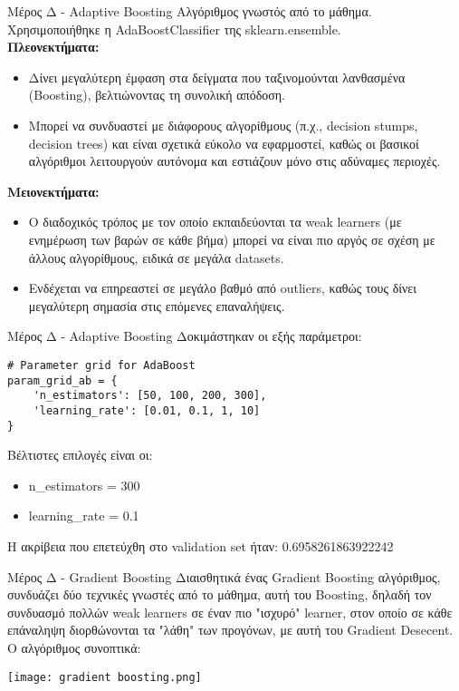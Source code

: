 \documentclass{beamer}
\begin{document}
\begin{frame}[fragile]{Μέρος Δ - Adaptive Boosting}
Αλγόριθμος γνωστός από το μάθημα. Χρησιμοποιήθηκε η AdaBoostClassifier της sklearn.ensemble.\\
\textbf{Πλεονεκτήματα:}
\begin{itemize}
    \item Δίνει μεγαλύτερη έμφαση στα δείγματα που ταξινομούνται λανθασμένα (Boosting), βελτιώνοντας τη συνολική απόδοση.
    \item Μπορεί να συνδυαστεί με διάφορους αλγορίθμους (π.χ., decision stumps, decision trees) και είναι σχετικά εύκολο να εφαρμοστεί, καθώς οι βασικοί αλγόριθμοι λειτουργούν αυτόνομα και εστιάζουν μόνο στις αδύναμες περιοχές.
\end{itemize}
\textbf{Μειονεκτήματα:}
\begin{itemize}
    \item Ο διαδοχικός τρόπος με τον οποίο εκπαιδεύονται τα weak learners (με ενημέρωση των βαρών σε κάθε βήμα) μπορεί να είναι πιο αργός σε σχέση με άλλους αλγορίθμους, ειδικά σε μεγάλα datasets.
    \item Ενδέχεται να επηρεαστεί σε μεγάλο βαθμό από outliers, καθώς τους δίνει μεγαλύτερη σημασία στις επόμενες επαναλήψεις.
\end{itemize}
\end{frame}
\begin{frame}[fragile]{Μέρος Δ -  Adaptive Boosting}
Δοκιμάστηκαν οι εξής παράμετροι:
\lstset{style=python}
\begin{lstlisting}
# Parameter grid for AdaBoost
param_grid_ab = {
    'n_estimators': [50, 100, 200, 300],
    'learning_rate': [0.01, 0.1, 1, 10]
}

\end{lstlisting}

Βέλτιστες επιλογές είναι οι:
\begin{itemize}
    \item n\_estimators = 300
    \item learning\_rate = 0.1

\end{itemize}
Η ακρίβεια που επετεύχθη στο validation set ήταν: 0.6958261863922242
\end{frame}



\begin{frame}[fragile]{Μέρος Δ - Gradient Boosting}
Διαισθητικά ένας Gradient Boosting αλγόριθμος, συνδυάζει δύο τεχνικές γνωστές από το μάθημα, αυτή του Boosting, δηλαδή τον συνδυασμό πολλών weak learners σε έναν πιο "ισχυρό" learner, στον οποίο σε κάθε επάναληψη διορθώνονται τα "λάθη" των προγόνων, με αυτή του Gradient Desecent. Ο αλγόριθμος συνοπτικά:

\begin{minipage}[t]{\textwidth}
\centering
\texttt{[image: gradient boosting.png]}  
\end{minipage}
\end{frame}
\end{document}
